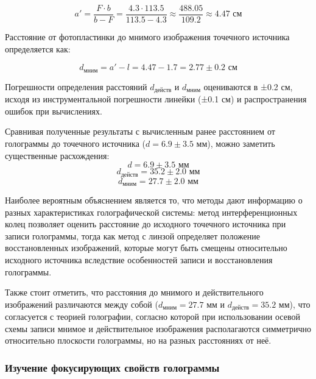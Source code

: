 \begin{equation}
    a' = \frac{F \cdot b}{b - F} = \frac{4.3 \cdot 113.5}{113.5 - 4.3} \approx \frac{488.05}{109.2} \approx 4.47 \text{ см}
\end{equation}

Расстояние от фотопластинки до мнимого изображения точечного источника определяется как:

\begin{equation}
    d_{\text{мним}} = a' - l = 4.47 - 1.7 = 2.77 \pm 0.2 \text{ см}
\end{equation}

Погрешности определения расстояний $d_{\text{действ}}$ и $d_{\text{мним}}$ оцениваются в ±0.2 см, исходя из инструментальной погрешности линейки (±0.1 см) и распространения ошибок при вычислениях.

Сравнивая полученные результаты с вычисленным ранее расстоянием от голограммы до точечного источника ($d = 6.9 \pm 3.5$ мм), можно заметить существенные расхождения:
\begin{equation}
    d = 6.9 \pm 3.5 \text{ мм} 
\end{equation}
\begin{equation}
    d_{\text{действ}} = 35.2 \pm 2.0 \text{ мм}
\end{equation}
\begin{equation}
    d_{\text{мним}} = 27.7 \pm 2.0 \text{ мм}
\end{equation}

Наиболее вероятным объяснением является то, что методы дают информацию о разных характеристиках голографической системы: метод интерференционных колец позволяет оценить расстояние до исходного точечного источника при записи голограммы, тогда как метод с линзой определяет положение восстановленных изображений, которые могут быть смещены относительно исходного источника вследствие особенностей записи и восстановления голограммы.

Также стоит отметить, что расстояния до мнимого и действительного изображений различаются между собой ($d_{\text{мним}} = 27.7$ мм и $d_{\text{действ}} = 35.2$ мм), что согласуется с теорией голографии, согласно которой при использовании осевой схемы записи мнимое и действительное изображения располагаются симметрично относительно плоскости голограммы, но на разных расстояниях от неё.

\subsubsection{Изучение фокусирующих свойств голограммы}

